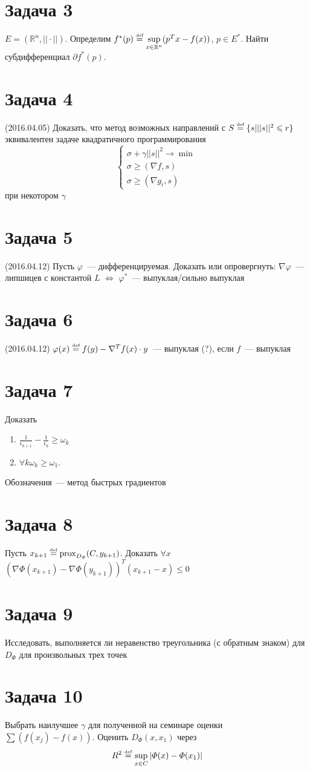 \documentclass[a4paper]{article}
\def\eqdef{\overset{\mbox{\tiny def}}{=}}
\begin{document}
\section*{Задача 3}
$E=(\mathbb{R}^n,||\cdot||)$. Определим $f^*(p)\eqdef\sup\limits_{x\in\mathbb{R}^n}(p^Tx-f(x))$, $p\in E^*$. Найти субдифференциал $\partial f^*(p)$.
\section*{Задача 4}
(2016.04.05)
Доказать, что метод возможных направлений с $S\eqdef \{s| ||s||^2\leqslant r\}$ эквивалентен задаче квадратичного программирования
$$\begin{cases}
\sigma+\gamma ||s||^2\to\min\\
\sigma\geqslant(\nabla f,s)\\
\sigma \geqslant (\nabla g_i,s)
\end{cases}$$
при некотором $\gamma$
\section*{Задача 5}
(2016.04.12)
Пусть $\varphi$~--- дифференцируемая. Доказать или опровергнуть:
$\nabla\varphi$~--- липшицев с константой $L$ $\Leftrightarrow$ $\varphi^*$~--- выпуклая/сильно выпуклая
\section*{Задача 6}
(2016.04.12)
$\varphi(x)\eqdef f(y)-\nabla^Tf(x)\cdot y$~--- выпуклая (?), если $f$~--- выпуклая
\section*{Задача 7}
Доказать\begin{enumerate}
\item $\frac{1}{\epsilon_{k+1}}-\frac{1}{\epsilon_{k}}\geqslant \omega_k$
\item $\forall k \omega_k\geqslant \omega_1$.
\end{enumerate}
Обозначения~--- метод быстрых градиентов
\section*{Задача 8}
Пусть $x_{k+1}\eqdef \mbox{prox}_{D_\varPhi}(C,y_{k+1})$. Доказать $\forall x$ $(\nabla\varPhi(x_{k+1})-\nabla\varPhi(y_{k+1}))^T(x_{k+1}-x)\leqslant 0$
\section*{Задача 9}
Исследовать, выполняется ли неравенство треугольника (с обратным знаком) для $D_{\varPhi}$ для произвольных трех точек
\section*{Задача 10}
Выбрать наилучшее $\gamma$ для полученной на семинаре оценки $\sum (f(x_j)-f(x))$. Оценить $D_{\varPhi}(x,x_1)$ через $$R^2\eqdef \sup_{x\in C}|\varPhi(x)-\varPhi(x_1)|$$
\end{document}
